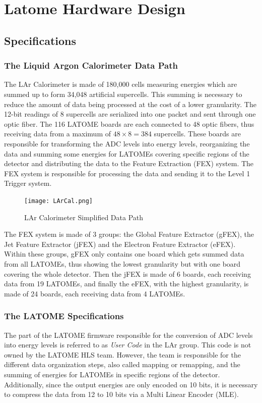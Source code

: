 \chapter{Latome Hardware Design}\label{ch:latome-firmware}

\section{Specifications}\label{sec:specifications}
\subsection{The Liquid Argon Calorimeter Data Path}\label{sec:lar}
The LAr Calorimeter is made of 180,000 cells measuring energies which are summed up to form 34,048 artificial supercells. This summing is necessary to reduce the amount of data being processed at the cost of a lower granularity. The 12-bit readings of 8 supercells are serialized into one packet and sent through one optic fiber. The 116 LATOME boards are each connected to 48 optic fibers, thus receiving data from a maximum of \(48\times8=384\) supercells. These boards are responsible for transforming the ADC levels into energy levels, reorganizing the data and summing some energies for LATOMEs covering specific regions of the detector and distributing the data to the Feature Extraction (FEX) system. The FEX system is responsible for processing the data and sending it to the Level 1 Trigger system.

\begin{figure}
    \centering
    \texttt{[image: LArCal.png]}
    \caption{LAr Calorimeter Simplified Data Path}
    \label{fig:lar-data-path}
\end{figure}

The FEX system is made of 3 groups: the Global Feature Extractor (gFEX), the Jet Feature Extractor (jFEX) and the Electron Feature Extractor (eFEX). Within these groups, gFEX only contains one board which gets summed data from all LATOMEs, thus showing the lowest granularity but with one board covering the whole detector. Then the jFEX is made of 6 boards, each receiving data from 19 LATOMEs, and finally the eFEX, with the highest granularity, is made of 24 boards, each receiving data from 4 LATOMEs.

\subsection{The LATOME Specifications}\label{sec:latome-specifications}
The part of the LATOME firmware responsible for the conversion of ADC levels into energy levels is referred to as \textit{User Code} in the LAr group. This code is not owned by the LATOME HLS team. However, the team is responsible for the different data organization steps, also called mapping or remapping, and the summing of energies for LATOMEs in specific regions of the detector. Additionally, since the output energies are only encoded on 10 bits, it is necessary to compress the data from 12 to 10 bits via a Multi Linear Encoder (MLE).

